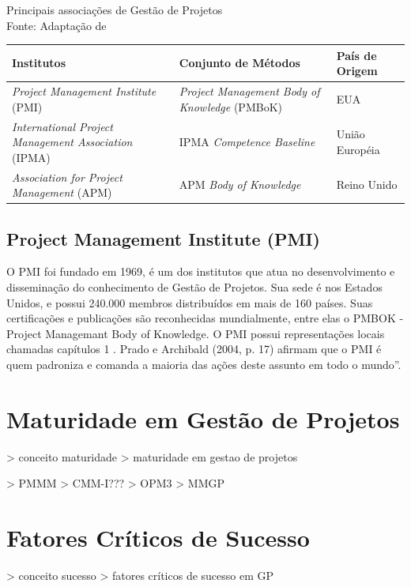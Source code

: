   \begin{quadro}[!htpb]
    \centering
    \label{quadro-institutos}
    \caption{Principais associações de Gestão de Projetos \\ Fonte: Adaptação de }
    \begin{tabular}{| m{} m{} m{}|}
      \hline
      \textbf{Institutos} & \textbf{Conjunto de Métodos} & \textbf{País de Origem} \\
      \hline \hline
      \textit{Project Management Institute} (PMI) & \textit{Project Management Body of Knowledge} (PMBoK) & EUA \\ \hline
      \textit{International Project Management Association} (IPMA) & IPMA \textit{Competence Baseline} & União Européia \\ \hline
      \textit{Association for Project Management} (APM) & APM \textit{Body of Knowledge} & Reino Unido \\ \hline
    \end{tabular}
  \end{quadro}

  \subsection{Project Management Institute (PMI)}

  O PMI foi fundado em 1969, é um dos institutos que atua no desenvolvimento e
  disseminação do conhecimento de Gestão de Projetos. Sua sede é nos Estados Unidos, e possui
  240.000 membros distribuídos em mais de 160 países. Suas certificações e publicações são
  reconhecidas mundialmente, entre elas o PMBOK - Project Managemant Body of Knowledge.
  O PMI possui representações locais chamadas capítulos 1 . Prado e Archibald (2004, p. 17)
  afirmam que o PMI é quem padroniza e comanda a maioria das ações deste assunto em todo o
  mundo”.

\section{Maturidade em Gestão de Projetos}
> conceito maturidade
> maturidade em gestao de projetos

> PMMM
> CMM-I???
> OPM3
> MMGP

\section{Fatores Críticos de Sucesso}
> conceito sucesso
> fatores críticos de sucesso em GP

